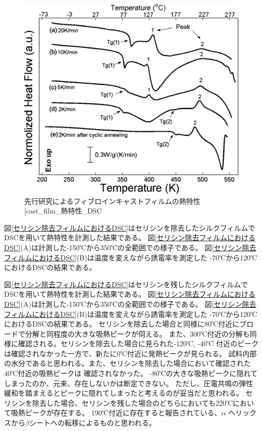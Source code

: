 \documentclass[dvipdfmx,12pt,a4paper]{jreport}
\makeatletter
\DeclareRobustCommand\cite{\unskip
    	\@ifnextchar[{\@tempswatrue\@citex}{\@tempswafalse\@citex[]}}
\makeatother
\begin{document}
	\begin{figure}[H]
		\centering
		\includegraphics[scale=1]{DSC_cast_film_report.jpeg}
		\caption{先行研究によるフィブロインキャストフィルムの熱特性\cite{cast_film_熱特性_DSC}}
		\label{cast_film_熱特性_DSC}
	\end{figure}
	\newpage
	図\ref{セリシン除去フィルムにおけるDSC}はセリシンを除去したシルクフィルムでDSCを用いて熱特性を計測した結果である。
	図\ref{セリシン除去フィルムにおけるDSC}(A)は計測した-150℃から350℃の全範囲での様子である。
	図\ref{セリシン除去フィルムにおけるDSC}(B)は温度を変えながら誘電率を測定した
	-70℃から120℃におけるDSCの結果である。

	図\ref{セリシン除去フィルムにおけるDSC}はセリシンを残したシルクフィルムでDSCを用いて熱特性を計測した結果である。
	図\ref{セリシン除去フィルムにおけるDSC}(A)は計測した-150℃から350℃の全範囲での様子である。
	図\ref{セリシン除去フィルムにおけるDSC}(B)は温度を変えながら誘電率を測定した
	-70℃から120℃におけるDSCの結果である。
	セリシンを除去した場合と同様に80℃付近にブロードで分解と同程度の大きな吸熱ピークが伺える。
	また、300℃付近の分解も同様に確認される。セリシンを除去した場合に見られた-120℃, -40℃
	付近のピークは確認されなかった一方で、新たに0℃付近に発熱ピークが見られる。
	試料内部の水分であると思われる。また、セリシンを除去した場合において確認された40℃付近の吸熱ピークは
	確認されなかった。
	-80℃の大きな吸熱ピークに隠れてしまったのか、元来、存在しないかは断定できない。
	ただし、圧電共鳴の弾性緩和を踏まえるとピークに隠れてしまったと考えるのが妥当だと思われる。
	セリシンを除去した場合、セリシンを残した場合のどちらにおいても220℃において吸熱ピークが存在する。
	190℃付近に存在すると報告されている、$\alpha$ ヘリックスから$\beta$シートへの転移によるものと思われる。
	\\
	\\
	\\
	\\
\end{document}
